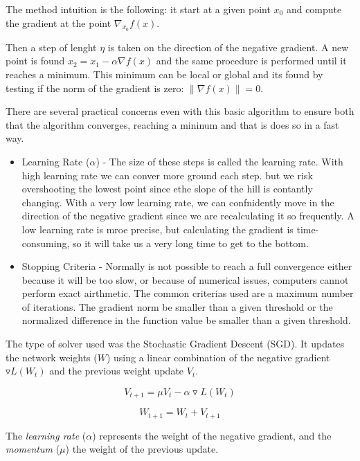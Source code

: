 The method intuition is the following: it start at a given point $x_0$ and compute the gradient at the point $\nabla_{x_0}f(x)$. 

Then a step of lenght $\eta$ is taken on the direction of the negative gradient. A new point is found $x_2 = x_1 - \alpha \nabla f(x)$ and the same procedure is performed until it reaches a minimum. This minimum can be local or global and its found by testing if the norm of the gradient is zero: $\left \| \nabla f(x) \right \| = 0$.

There are several practical concerns even with this basic algorithm to ensure both that the algorithm converges, reaching a mininum and that is does so in a fast way.

\begin{itemize}
\item Learning Rate ($\alpha$) - The size of these steps is called the learning rate. With high learning rate we can conver more ground each step. but we risk overshooting the lowest point since ethe slope of the hill is contantly changing. With a very low learning rate, we can confnidently move in the direction of the negative gradient since we are recalculating it so frequently. A low learning rate is mroe precise, but calculating the gradient is time-consuming, so it will take us a very long time to get to the bottom.
\item Stopping Criteria - Normally is not possible to reach a full convergence either because it will be too slow, or because of numerical issues, computers cannot perform exact airthmetic. The common criterias used are a maximum number of iterations. The gradient norm be smaller than a given threshold or the normalized difference in the function value be smaller than a given threshold.
\end{itemize}

The type of solver used was the Stochastic Gradient Descent (SGD). It updates the network weights ($W$) using a linear combination of the negative gradient $\triangledown L\left ( W_t \right )$ and the previous weight update $V_t$. 

$$ V_{t + 1} = \mu V_t - \alpha \triangledown L\left ( W_t \right ) $$ 

$$ W_{t+1}=W_t+V_{t+1} $$ 

The \emph{learning rate} ($\alpha$) represents the weight of the negative gradient, and the \emph{momentum} ($\mu$) the weight of the previous update.


